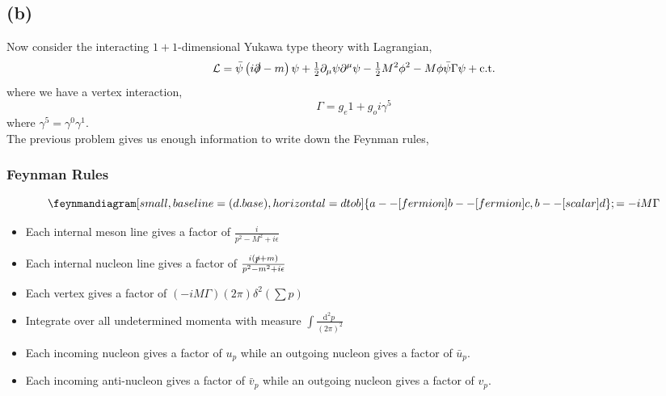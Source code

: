 \documentclass[12pt]{article}
\newcommand{\dn}[2]{ \mathrm{d}^{#1} #2 \:}
\newcommand{\lagrange}{\mathcal{L}}
\begin{document}
\subsection{(b)}

Now consider the interacting $1+1$-dimensional Yukawa type theory with Lagrangian,
\[ \lagrange = \bar{\psi} \left( i \slashed{\partial} - m \right) \psi + \tfrac{1}{2} \partial_\mu \psi \partial^\mu \psi - \tfrac{1}{2} M^2 \phi^2 - M \phi \bar{\psi} \Gamma \psi + \mathrm{ c.t. }\]
where we have a vertex interaction,
\[ \Gamma = g_e \mathrm{1} + g_o i \gamma^5 \]
where $\gamma^5 = \gamma^0 \gamma^1$. 
\bigskip\\
The previous problem gives us enough information to write down the Feynman rules,
\subsubsection{Feynman Rules}
\begin{equation*}
\feynmandiagram [small, baseline=(d.base), horizontal=d to b] {
a -- [fermion] b -- [fermion] c,
b -- [scalar] d
};
= -i M \Gamma
\end{equation*}
\begin{itemize}
\item Each internal meson line gives a factor of $\frac{i}{p^2 - M^2 + i \epsilon}$
\item Each internal nucleon line gives a factor of $\frac{i (\slashed{p} + m)}{p^2 - m^2 + i \epsilon}$
\item Each vertex gives a factor of $(-i M \Gamma)(2 \pi) \delta^2(\sum p)$
\item Integrate over all undetermined momenta with measure $\int \frac{\dn{2}{p}}{(2\pi)^2}$
\item Each incoming nucleon gives a factor of $u_p$ while an outgoing nucleon gives a factor of $\bar{u}_p$.
\item Each incoming anti-nucleon gives a factor of $\bar{v}_p$ while an outgoing nucleon gives a factor of $v_p$.
\end{itemize}
\end{document}
